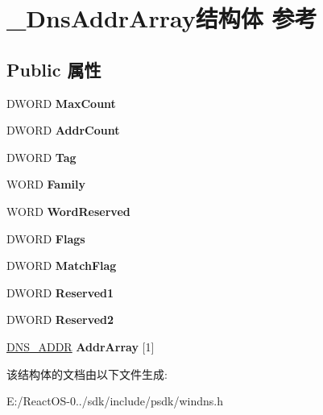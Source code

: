 \hypertarget{struct___dns_addr_array}{}\section{\+\_\+\+Dns\+Addr\+Array结构体 参考}
\label{struct___dns_addr_array}
\subsection*{Public 属性}
\begin{DoxyCompactItemize}
\item 
\mbox{\label{struct___dns_addr_array_a70a9ea8ba90bb58d17c2c33e0f9759b9}} 
D\+W\+O\+RD {\bfseries Max\+Count}
\item 
\mbox{\label{struct___dns_addr_array_a21b0b3c11003c73ac7c7deaee4da1efa}} 
D\+W\+O\+RD {\bfseries Addr\+Count}
\item 
\mbox{\label{struct___dns_addr_array_a9cb1e650ba26499f14c88a988be2a936}} 
D\+W\+O\+RD {\bfseries Tag}
\item 
\mbox{\label{struct___dns_addr_array_ad1ea56aa518410c58d5321577519ab53}} 
W\+O\+RD {\bfseries Family}
\item 
\mbox{\label{struct___dns_addr_array_a1eb82c04719bab15a0c567c075044d28}} 
W\+O\+RD {\bfseries Word\+Reserved}
\item 
\mbox{\label{struct___dns_addr_array_a39bcdb76864b374004fa6ea1f0a1649f}} 
D\+W\+O\+RD {\bfseries Flags}
\item 
\mbox{\label{struct___dns_addr_array_ac8fbee3bd11ea223b3944e684a3905ce}} 
D\+W\+O\+RD {\bfseries Match\+Flag}
\item 
\mbox{\label{struct___dns_addr_array_ab8edcfcd1cd2ff2829e2fc006e96c75e}} 
D\+W\+O\+RD {\bfseries Reserved1}
\item 
\mbox{\label{struct___dns_addr_array_a55153145068a838bc70c32c2fdcf0ad8}} 
D\+W\+O\+RD {\bfseries Reserved2}
\item 
\mbox{\label{struct___dns_addr_array_a076447bebf52196b97c9ab995c6697aa}} 
\hyperlink{struct___dns_addr}{D\+N\+S\+\_\+\+A\+D\+DR} {\bfseries Addr\+Array} \mbox{[}1\mbox{]}
\end{DoxyCompactItemize}


该结构体的文档由以下文件生成\+:\begin{DoxyCompactItemize}
\item 
E\+:/\+React\+O\+S-\/0../sdk/include/psdk/windns.\+h\end{DoxyCompactItemize}
